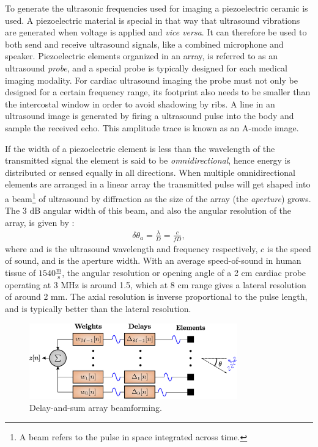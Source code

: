 To generate the ultrasonic frequencies used for imaging a piezoelectric ceramic is used. A piezoelectric material is special in that way that ultrasound vibrations are generated when voltage is applied and \textit{vice versa}. It can therefore be used to both send and receive ultrasound signals, like a combined microphone and speaker. Piezoelectric elements organized in an array, is referred to as an ultrasound \textit{probe}, and a special probe is typically designed for each medical imaging modality. For cardiac ultrasound imaging the probe must not only be designed for a certain frequency range, its footprint also needs to be smaller than the intercostal window in order to avoid shadowing by ribs. A line in an ultrasound image is generated by firing a ultrasound pulse into the body and sample the received echo. This amplitude trace is known as an A-mode image. 

If the width of a piezoelectric element is less than the wavelength of the transmitted signal the element is said to be \textit{omnidirectional}, hence energy is distributed or sensed equally in all directions. When multiple omnidirectional elements are arranged in a linear array the transmitted pulse will get shaped into a beam\footnote{A beam refers to the pulse in space integrated across time.} of ultrasound by diffraction as the size of the array  (the \textit{aperture}) grows. The 3 dB angular width of this beam, and also the angular resolution of the array, is given by \cite{AngelUltrasound}:
\begin{align}\label{eq:res}
\delta\theta_a = \frac{\lambda}{D} = \frac{c}{fD},
\end{align}
where  and  is the ultrasound wavelength and frequency respectively, $c$ is the speed of sound, and  is the aperture width. With an average speed-of-sound in human tissue of $1540\frac{\text{m}}{\text{s}}$, the angular resolution or opening angle of a 2 cm cardiac probe operating at 3 MHz is around 1.5\degree, which at 8 cm range gives a lateral resolution of around 2 mm. The axial resolution is inverse proportional to the pulse length, and is typically better than the lateral resolution.

\begin{figure}
\centering
\includegraphics[width=0.8\textwidth]{img/beamforming_das.eps}
\caption{Delay-and-sum array beamforming.}
\label{fig:das}
\end{figure}

